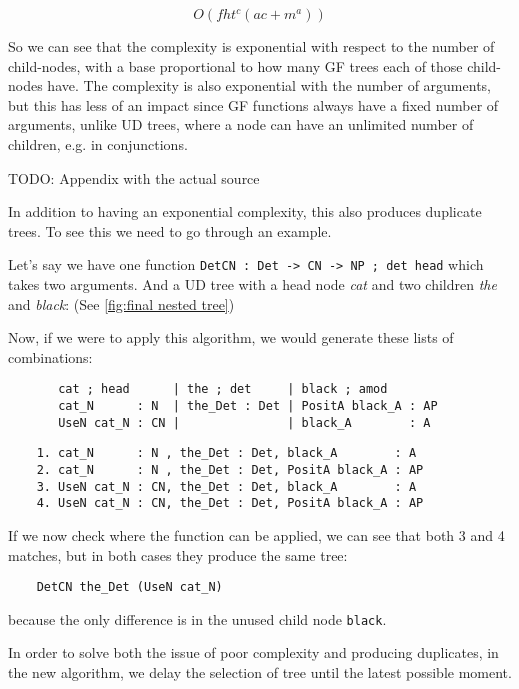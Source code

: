 $$
O(f h t^c (ac+m^a))
$$

So we can see that the complexity is exponential with respect to the number of child-nodes, with a base proportional to how many GF trees each of those child-nodes have. The complexity is also exponential with the number of arguments, but this has less of an impact since GF functions always have a fixed number of arguments, unlike UD trees, where a node can have an unlimited number of children, e.g. in conjunctions.

TODO: Appendix with the actual source

In addition to having an exponential complexity, this also produces duplicate trees. To see this we need to go through an example.

Let's say we have one function \verb|DetCN : Det -> CN -> NP ; det head| which takes two arguments.
And a UD tree with a head node \emph{cat} and two children \emph{the} and \emph{black}: (See \autoref{fig:final nested tree})

Now, if we were to apply this algorithm, we would generate these lists of combinations:
\begin{verbatim}
       cat ; head      | the ; det     | black ; amod
       cat_N      : N  | the_Det : Det | PositA black_A : AP
       UseN cat_N : CN |               | black_A        : A
\end{verbatim}

\begin{verbatim}
    1. cat_N      : N , the_Det : Det, black_A        : A
    2. cat_N      : N , the_Det : Det, PositA black_A : AP
    3. UseN cat_N : CN, the_Det : Det, black_A        : A
    4. UseN cat_N : CN, the_Det : Det, PositA black_A : AP
\end{verbatim}

If we now check where the function can be applied, we can see that both 3 and 4 matches,
but in both cases they produce the same tree:
\begin{verbatim}
    DetCN the_Det (UseN cat_N)
\end{verbatim}
because the only difference is in the unused child node \verb|black|.

In order to solve both the issue of poor complexity and producing duplicates, in the new algorithm, we delay the selection of tree until the latest possible moment.




